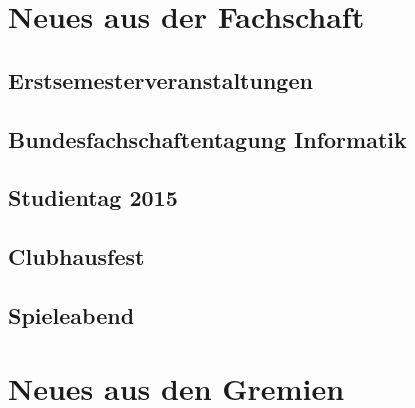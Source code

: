 \documentclass{fsinewsletter}
\begin{document}



\tableofcontents
\newpage



\newpage

\section{Neues aus der Fachschaft}
%

\subsection{Erstsemesterveranstaltungen}


\subsection{Bundesfachschaftentagung Informatik}


\subsection{Studientag 2015}


\subsection{Clubhausfest}


\subsection{Spieleabend}


\newpage
\section{Neues aus den Gremien}
\end{document}
